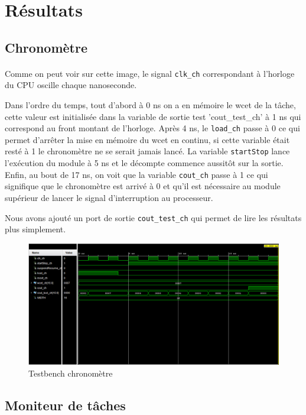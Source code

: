 \documentclass[a4paper,12pt]{report}
\begin{document}
						
	\section{Résultats}
		\subsection{Chronomètre}
			\paragraph*{}
			Comme on peut voir sur cette image, le signal \texttt{clk\_ch} correspondant à l'horloge du CPU oscille chaque nanoseconde.
			
			Dans l'ordre du temps, tout d'abord à 0 ns on a en mémoire le wcet de la tâche, cette valeur est initialisée dans la variable de sortie test 'cout\_test\_ch' à 1 ns qui correspond au front montant de l'horloge. Après 4 ns, le \texttt{load\_ch} passe à 0 ce qui permet d'arrêter la mise en mémoire du wcet en continu, si cette variable était resté à 1 le chronomètre ne se serait jamais lancé. La variable \texttt{startStop} lance l'exécution du module à 5 ns et le décompte commence aussitôt sur la sortie. Enfin, au bout de 17 ns, on voit que la variable \texttt{cout\_ch} passe à 1 ce qui signifique que le chronomètre est arrivé à 0 et qu'il est nécessaire au module supérieur de lancer le signal d'interruption au processeur.
			
			Nous avons ajouté un port de sortie \texttt{cout\_test\_ch} qui permet de lire les résultats plus simplement.
			
			\begin{figure}[H]
				\centering
					\includegraphics[scale=0.5]{chrono_tb.png}
					\caption{Testbench chronomètre}
				\label{chronoTB}
			\end{figure}
			
		\subsection{Moniteur de tâches}
\end{document}
